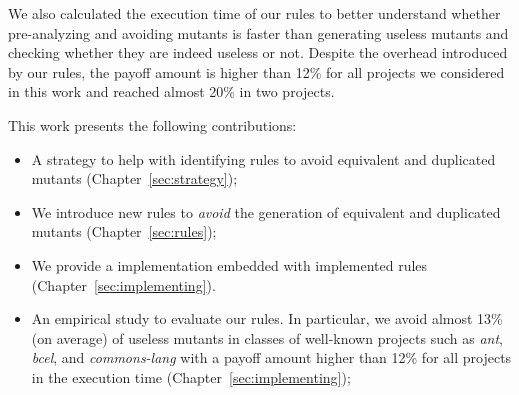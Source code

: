 We also calculated the execution time of our rules to better understand whether pre-analyzing and avoiding mutants is faster than generating useless mutants and checking whether they are indeed useless or not. Despite the overhead introduced by our rules, the payoff amount is higher than 12\% for all projects we considered in this work and reached almost 20\% in two projects.


This work presents the following contributions:

\begin{itemize}
    
    \item A strategy to help with identifying rules to avoid equivalent and duplicated mutants (Chapter~\ref{sec:strategy});
    
    \item We introduce \NumberOfNewHeuristics new rules to \textit{avoid} the generation of equivalent and duplicated mutants (Chapter~\ref{sec:rules});
    
    \item We provide a \mujava{} implementation embedded with \NumberOfImplementedHeuristics implemented rules (Chapter~\ref{sec:implementing}).
    
    \item An empirical study to evaluate our rules. In particular, we avoid almost 13\% (on average) of useless mutants in classes of well-known projects such as \textit{ant}, \textit{bcel}, and \textit{commons-lang} with a payoff amount higher than 12\% for all projects in the execution time (Chapter~\ref{sec:implementing});
    
\end{itemize}


